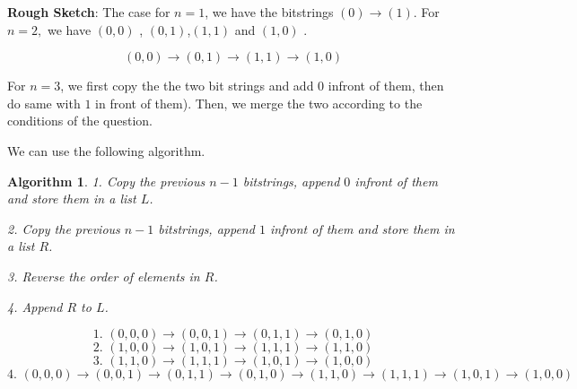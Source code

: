 \documentclass{article}
\newtheorem{algorithm}[theorem]{Algorithm}
\begin{document}
\textbf{Rough Sketch}: The case for $n=1$, we have the bitstrings $%
(0)\rightarrow (1)$. For $n=2,$ we have $(0,0)$ , $(0,1)$,$(1,1)$ and $(1,0)$%
.

\begin{equation*}
(0,0)\rightarrow (0,1)\rightarrow (1,1)\rightarrow (1,0)
\end{equation*}

For $n=3$, we first copy the the two bit strings and add $0$ infront of
them, then do same with $1$ in front of them). Then, we merge the two
according to the conditions of the question.

We can use the following algorithm.

\begin{algorithm}
1. Copy the previous $n-1$ bitstrings, append $0$ infront of them and store
them in a list $L$.

2. Copy the previous $n-1$ bitstrings, append $1$ infront of them and store
them in a list $R$.

3. Reverse the order of elements in $R$.

4. Append $R$ to $L$.
\end{algorithm}

\begin{equation*}
\text{1. }(0,0,0)\rightarrow (0,0,1)\rightarrow (0,1,1)\rightarrow (0,1,0)
\end{equation*}%
\begin{equation*}
\text{2. }(1,0,0)\rightarrow (1,0,1)\rightarrow (1,1,1)\rightarrow (1,1,0)
\end{equation*}%
\begin{equation*}
\text{3. }(1,1,0)\rightarrow (1,1,1)\rightarrow (1,0,1)\rightarrow (1,0,0)
\end{equation*}%
\begin{equation*}
\text{4. }(0,0,0)\rightarrow (0,0,1)\rightarrow (0,1,1)\rightarrow
(0,1,0)\rightarrow (1,1,0)\rightarrow (1,1,1)\rightarrow (1,0,1)\rightarrow
(1,0,0)
\end{equation*}
\end{document}
